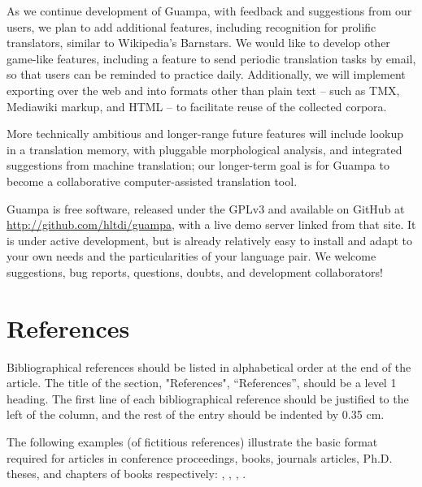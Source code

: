 \documentclass[10pt, a4paper]{article}
\begin{document}
As we continue development of Guampa, with feedback and suggestions from our
users, we plan to add additional features, including recognition for prolific
translators, similar to Wikipedia's Barnstars. We would like to develop other
game-like features, including a feature to send periodic translation tasks by
email, so that users can be reminded to practice daily. Additionally, we will
implement exporting over the web and into formats other than plain text -- such
as TMX, Mediawiki markup, and HTML --  to facilitate reuse of the collected
corpora.

More technically ambitious and longer-range future features will include lookup
in a translation memory, with pluggable morphological analysis, and integrated
suggestions from machine translation; our longer-term goal is for Guampa to
become a collaborative computer-assisted translation tool.

Guampa is free software, released under the GPLv3 and available on GitHub at
\url{http://github.com/hltdi/guampa}, with a live demo server linked from that
site. It is under active development, but is already relatively easy to install
and adapt to your own needs and the particularities of your language pair. We
welcome suggestions, bug reports, questions, doubts, and development
collaborators!

\section{References}
Bibliographical references should be listed in alphabetical order at the end of
the article. The title of the section, "References", ``References'', should be
a level 1 heading. The first line of each bibliographical reference should be
justified to the left of the column, and the rest of the entry should be
indented by 0.35 cm.

The following examples (of fictitious references) illustrate the basic format
required for articles in conference proceedings, books, journals articles,
Ph.D. theses, and chapters of books respectively:
\cite{Martin-90},  \cite{Chercheur-94},  \cite{CastorPollux-92}
\cite{Zavatta-92},  \cite{Grandchercheur-83}.



\end{document}
